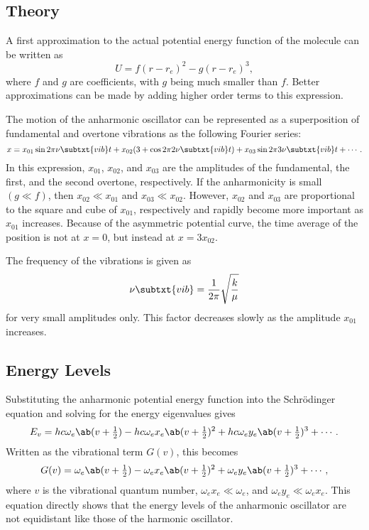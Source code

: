 \subsection{Theory}

A first approximation to the actual potential energy function of the molecule can be written as
\begin{equation*}
    U = f(r - r_{e})^{2} - g(r - r_{e})^{3},
\end{equation*}
where $f$ and $g$ are coefficients, with $g$ being much smaller than $f$. Better approximations can be made by adding higher order terms to this expression.

The motion of the anharmonic oscillator can be represented as a superposition of fundamental and overtone vibrations as the following Fourier series:
\begin{equation*}
    x = x_{01}\sin{2\pi\nu\subtxt{vib}t} + x_{02}(3 + \cos{2\pi2\nu\subtxt{vib}t}) + x_{03}\sin{2\pi3\nu\subtxt{vib}t} + \dotsb.
\end{equation*}
In this expression, $x_{01}$, $x_{02}$, and $x_{03}$ are the amplitudes of the fundamental, the first, and the second overtone, respectively. If the anharmonicity is small $(g \ll f)$, then $x_{02} \ll x_{01}$ and $x_{03} \ll x_{02}$. However, $x_{02}$ and $x_{03}$ are proportional to the square and cube of $x_{01}$, respectively and rapidly become more important as $x_{01}$ increases. Because of the asymmetric potential curve, the time average of the position is not at $x = 0$, but instead at $x = 3x_{02}$.

The frequency of the vibrations is given as
\begin{equation*}
    \nu\subtxt{vib} = \frac{1}{2\pi}\sqrt{\frac{k}{\mu}}
\end{equation*}
for very small amplitudes only. This factor decreases slowly as the amplitude $x_{01}$ increases.

\subsection{Energy Levels}

Substituting the anharmonic potential energy function into the Schr\"odinger equation and solving for the energy eigenvalues gives
\begin{equation*}
    E_{v} = hc\omega_{e}\ab(v + \tfrac{1}{2}) - hc\omega_{e}x_{e}\ab(v + \tfrac{1}{2})^{2} + hc\omega_{e}y_{e}\ab(v + \tfrac{1}{2})^{3} + \dotsb.
\end{equation*}
Written as the vibrational term $G(v)$, this becomes
\begin{equation*}
    G(v) = \omega_{e}\ab(v + \tfrac{1}{2}) - \omega_{e}x_{e}\ab(v + \tfrac{1}{2})^{2} + \omega_{e}y_{e}\ab(v + \tfrac{1}{2})^{3} + \dotsb,
\end{equation*}
where $v$ is the vibrational quantum number, $\omega_{e}x_{e} \ll \omega_{e}$, and $\omega_{e}y_{e} \ll \omega_{e}x_{e}$. This equation directly shows that the energy levels of the anharmonic oscillator are not equidistant like those of the harmonic oscillator.

